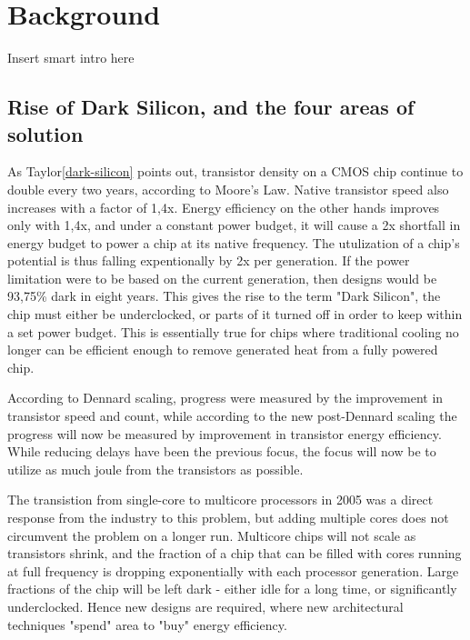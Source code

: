 \chapter{Background}
\label{cha:background}

Insert smart intro here


\section{Rise of Dark Silicon, and the four areas of solution}
\label{sec:dark-silicon}
As Taylor\ref{dark-silicon} points out, transistor density on a CMOS chip continue to double every two years, according to Moore's Law.
Native transistor speed also increases with a factor of 1,4x.
Energy efficiency on the other hands improves only with 1,4x, and under a constant power budget, it will cause a 2x shortfall in energy budget to power a chip at its native frequency.
The utulization of a chip's potential is thus falling expentionally by 2x per generation.
If the power limitation were to be based on the current generation, then designs would be 93,75\% dark in eight years.
This gives the rise to the term "Dark Silicon", the chip must either be underclocked, or parts of it turned off in order to keep within a set power budget.
This is essentially true for chips where  traditional cooling no longer can be efficient enough to remove generated heat from a fully powered chip.

According to Dennard scaling, progress were measured by the improvement in transistor speed and count, while according to the new post-Dennard scaling the progress will now be measured by improvement in transistor energy efficiency.
While reducing delays have been the previous focus, the focus will now be to utilize as much joule from the transistors as possible.

The transistion from single-core to multicore processors in 2005 was a direct response from the industry to this problem, but adding multiple cores does not circumvent the problem on a longer run.
Multicore chips will not scale as transistors shrink, and the fraction of a chip that can be filled with cores running at full frequency is dropping exponentially with each processor generation. 
Large fractions of the chip will be left dark - either idle for a long time, or significantly underclocked.
Hence new designs are required, where new architectural techniques "spend" area to "buy" energy efficiency.

